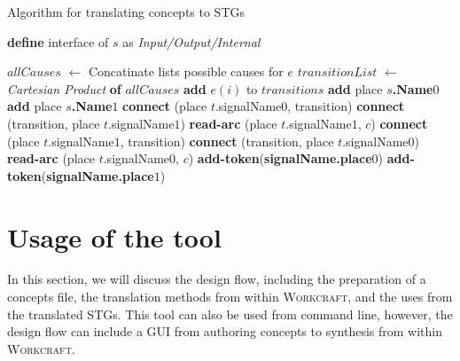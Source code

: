 \documentclass[british,conference,compsoc]{IEEEtran}
\newcommand{\noun}[1]{\textsc{#1}}
\begin{document}
\begin{algorithm}[h]
\begin{algorithmic}
\caption{Algorithm for translating concepts to STGs\label{alg:translation}}
  \State \textbf{define} interface of $s$ as \emph{Input/Output/Internal}
\EndFor

  \State $allCauses$ $\leftarrow$ Concatinate lists  possible causes for $e$
  \State $transitionList$ $\leftarrow$ \emph{Cartesian Product} \textbf{of} 
	$allCauses$
    \State \textbf{add} $e(i)$ to $transitions$
  \EndFor 
\EndFor
{}
  \State \textbf{add} place \textbf{$s$.Name}$0$
  \State \textbf{add} place \textbf{$s$.Name}$1$
\EndFor
{}
    \State \textbf{connect} (place $t$.signalName$0$, transition)
    \State \textbf{connect} (transition, place $t$.signalName$1$)
      \State \textbf{read-arc} (place $t$.signalName$1$, $c$)
    \EndFor
  \EndIf
    \State \textbf{connect} (place $t$.signalName$1$, transition)
    \State \textbf{connect} (transition, place $t$.signalName$0$)
      \State \textbf{read-arc} (place $t$.signalName$0$, $c$)
    \EndFor
  \EndIf
\EndFor
{}
    \State \textbf{add-token}(\textbf{signalName.place}$0$)
  \EndIf 
    \State \textbf{add-token}(\textbf{signalName.place}$1$)
  \EndIf
\EndFor
\end{algorithmic}
\end{algorithm}


\section{Usage of the tool\label{sec:tool-use}}

\vspace{-2mm}


In this section, we will discuss the design flow, including the preparation of 
a concepts file, the translation methods from within \noun{Workcraft}, and 
the uses from the translated STGs. This tool can also be used from command line,
however, the design flow can include a GUI from authoring concepts to synthesis
from within \noun{Workcraft}. 
\end{document}
